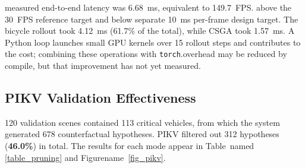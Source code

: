 measured end-to-end latency was 6.68~ms, equivalent to 149.7~FPS.  above the 30~FPS reference target and below separate 10~ms per-frame design target. The bicycle rollout took 4.12~ms (61.7\% of the total), while CSGA took 1.57~ms. A Python loop launches small GPU kernels over  15 rollout steps and contributes to the cost;  combining these operations with \texttt{torch}.overhead may be reduced by compile, but that improvement has not yet  measured.

\subsection{PIKV Validation Effectiveness}
120 validation scenes contained 113 critical vehicles, from which the system generated 678 counterfactual hypotheses. PIKV filtered out 312 hypotheses (\textbf{46.0\%}) in total. The results for each mode appear in Table~named \ref{table_pruning} and Figurename~\ref{fig_pikv}.

\begin{table}[H]
\caption{PIKV hypothesis pruning across the six counterfactual modes (678 hypotheses, 113 per mode, from real traffic validation samples).}
\label{table_pruning}
\centering
{}
\end{table}

